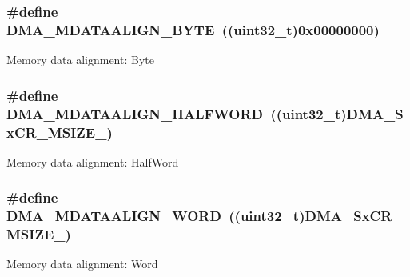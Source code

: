 \subsubsection[{\texorpdfstring{D\+M\+A\+\_\+\+M\+D\+A\+T\+A\+A\+L\+I\+G\+N\+\_\+\+B\+Y\+TE}{DMA_MDATAALIGN_BYTE}}]{\setlength{\rightskip}{0pt plus 5cm}\#define D\+M\+A\+\_\+\+M\+D\+A\+T\+A\+A\+L\+I\+G\+N\+\_\+\+B\+Y\+TE~((uint32\+\_\+t)0x00000000)}\hypertarget{group___d_m_a___memory__data__size_ga9ed07bddf736298eba11508382ea4d51}{}\label{group___d_m_a___memory__data__size_ga9ed07bddf736298eba11508382ea4d51}
Memory data alignment\+: Byte 
\subsubsection[{\texorpdfstring{D\+M\+A\+\_\+\+M\+D\+A\+T\+A\+A\+L\+I\+G\+N\+\_\+\+H\+A\+L\+F\+W\+O\+RD}{DMA_MDATAALIGN_HALFWORD}}]{\setlength{\rightskip}{0pt plus 5cm}\#define D\+M\+A\+\_\+\+M\+D\+A\+T\+A\+A\+L\+I\+G\+N\+\_\+\+H\+A\+L\+F\+W\+O\+RD~((uint32\+\_\+t)D\+M\+A\+\_\+\+Sx\+C\+R\+\_\+\+M\+S\+I\+Z\+E\+\_)}\hypertarget{group___d_m_a___memory__data__size_ga2c7355971c0da34a7ffe50ec87403071}{}\label{group___d_m_a___memory__data__size_ga2c7355971c0da34a7ffe50ec87403071}
Memory data alignment\+: Half\+Word 
\subsubsection[{\texorpdfstring{D\+M\+A\+\_\+\+M\+D\+A\+T\+A\+A\+L\+I\+G\+N\+\_\+\+W\+O\+RD}{DMA_MDATAALIGN_WORD}}]{\setlength{\rightskip}{0pt plus 5cm}\#define D\+M\+A\+\_\+\+M\+D\+A\+T\+A\+A\+L\+I\+G\+N\+\_\+\+W\+O\+RD~((uint32\+\_\+t)D\+M\+A\+\_\+\+Sx\+C\+R\+\_\+\+M\+S\+I\+Z\+E\+\_)}\hypertarget{group___d_m_a___memory__data__size_ga8812da819f18c873249074f3920220b2}{}\label{group___d_m_a___memory__data__size_ga8812da819f18c873249074f3920220b2}
Memory data alignment\+: Word 